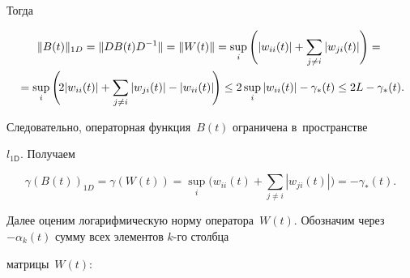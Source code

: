 \vspace*{-3pt}



\noindent

Тогда



\vspace*{-9pt}



\noindent

\begin{multline*}

    \|B(t)\|_{1D} = \|D B(t) D^{-1}\| = \|W(t)\| =

    \sup\limits_i \Bigg(|w_{ii}(t)| + \sum\limits_{j\neq i} |w_{ji}(t)|\Bigg) = {}\\

{}    = \sup\limits_i \Bigg( \! 2|w_{ii}(t)| + \sum\limits_{j\neq i} |w_{ji}(t)|- 

|w_{ii}(t)|\!\Bigg) \le 2 \sup\limits_i

    |w_{ii}(t)| - \gamma_{*}(t)\le  2L -\gamma_{*}(t). \hspace*{-0.89867pt}


\end{multline*}

Следовательно, операторная функция~$B(t)$ ограничена в~пространстве 

$l_{1\textsf{D}}$. Получаем





\noindent

\begin{equation*}

\gamma\left(B(t)\right)_{1D} = \gamma \left(W(t)\right)  = \sup\limits_i 

\Bigg(w_{ii}(t) + \sum\limits_{j\neq i}|w_{ji}(t)|\Bigg) =  - \gamma_{*}(t) .


\end{equation*}



\vspace*{-2pt}



Далее оценим логарифмическую норму оператора~$W(t) $. Обозначим через $ -\alpha_{k}(t) $ сумму всех элементов $k$-го столбца 

мат\-ри\-цы~$W(t) $:

